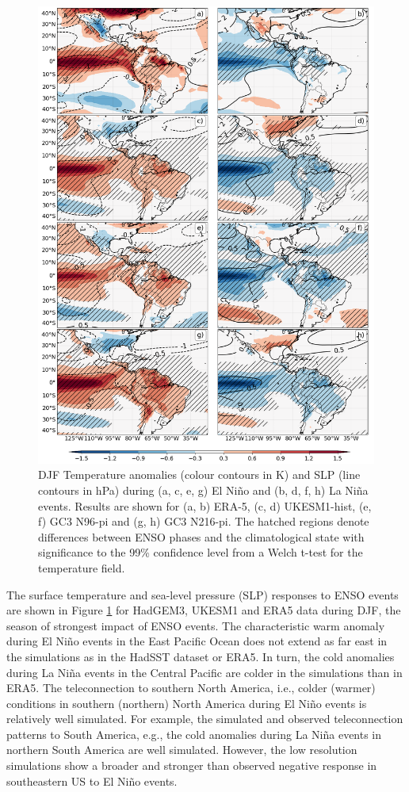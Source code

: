 \begin{figure}[t!]
\centering
 \includegraphics[width=0.81\linewidth]{figures/ensotemp_3}
\caption[ENSO teleconnections of temperature and SLP to the region of the AMS]{ DJF Temperature anomalies (colour contours in K) and SLP (line contours in hPa) during (a, c, e, g) El Ni\~no and (b, d, f, h) La Ni\~na events. Results are shown for (a, b) ERA-5, (c, d) UKESM1-hist, (e, f) GC3 N96-pi and (g, h) GC3 N216-pi. The hatched regions denote differences between ENSO phases and the climatological state with significance to the 99\% confidence level from a Welch t-test for the temperature field. }
\label{fig:10}
\end{figure}

The surface temperature and sea-level pressure (SLP) responses to ENSO events are shown in Figure \ref{fig:10} for HadGEM3, UKESM1 and ERA5 data during DJF, the season of strongest impact of ENSO events.
The characteristic warm anomaly during El Ni\~no events in the East Pacific Ocean does not extend as far east in the simulations as in the HadSST dataset or ERA5. In turn, the cold anomalies during La Ni\~na events in the Central Pacific are colder in the simulations than in ERA5. 
The teleconnection to southern North America, i.e., colder (warmer) conditions in southern (northern) North America during El Ni\~no events is relatively well simulated. For example, the simulated and observed teleconnection patterns to South America, e.g., the cold anomalies during La Ni\~na events in northern South America are well simulated. However, the low resolution simulations show a broader and stronger than observed negative response in southeastern US to El Ni\~no events. 

